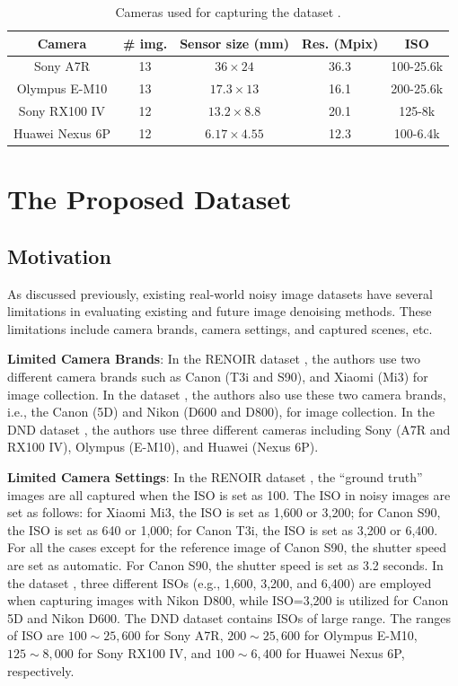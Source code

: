 \begin{table}[ht!]
\caption{Cameras used for capturing the dataset \cite{dnd2017}.}
\vspace{-5mm}
\label{tab6-3}
\begin{center}
\small
\renewcommand\arraystretch{1.2}
\begin{tabular*}{1\textwidth}{@{\extracolsep{\fill}}ccccc}
\hline
Camera
&
\# img.
&
Sensor size (mm)
&
Res. (Mpix)
&
ISO
\\
\hline
Sony A7R & 13  & $36\times24$  & 36.3  & 100-25.6k
\\
\hline
Olympus E-M10 & 13  & $17.3\times13$  & 16.1  & 200-25.6k 
\\
\hline   
Sony RX100 IV & 12 & $13.2\times8.8$  & 20.1  & 125-8k 
\\
\hline   
Huawei Nexus 6P & 12 & $6.17\times4.55$  & 12.3  & 100-6.4k 
\\
\hline
\end{tabular*}
\end{center}
\end{table}


\section{The Proposed Dataset}

\subsection{Motivation}
As discussed previously, existing real-world noisy image datasets \cite{RENOIR2014,crosschannel2016,dnd2017} have several limitations in evaluating existing and future image denoising methods. These limitations include camera brands, camera settings, and captured scenes, etc.

\textbf{Limited Camera Brands}: In the RENOIR dataset \cite{RENOIR2014}, the authors use two different camera brands such as Canon (T3i and S90), and Xiaomi (Mi3) for image collection. In the dataset \cite{crosschannel2016}, the authors also use these two camera brands, i.e., the Canon (5D) and Nikon (D600 and D800), for image collection. In the DND dataset \cite{dnd2017}, the authors use three different cameras including Sony (A7R and RX100 IV),  Olympus (E-M10), and Huawei (Nexus 6P).

\textbf{Limited Camera Settings}: In the RENOIR dataset \cite{RENOIR2014}, the ``ground truth'' images are all captured when the ISO is set as 100. The ISO in noisy images are set as follows: for Xiaomi Mi3, the ISO is set as 1,600 or 3,200; for Canon S90, the ISO is set as 640 or 1,000; for Canon T3i, the ISO is set as 3,200 or 6,400. For all the cases except for the reference image of Canon S90, the shutter speed are set as automatic. For Canon S90, the shutter speed is set as 3.2 seconds. In the dataset \cite{crosschannel2016}, three different ISOs (e.g., 1,600, 3,200, and 6,400) are employed when capturing images with Nikon D800, while ISO=3,200 is utilized for Canon 5D and Nikon D600. The DND dataset \cite{dnd2017} contains ISOs of large range. The ranges of ISO are $100\sim25,600$ for Sony A7R, $200\sim25,600$ for Olympus E-M10, $125\sim8,000$ for Sony RX100 IV, and $100\sim6,400$ for Huawei Nexus 6P, respectively. 

